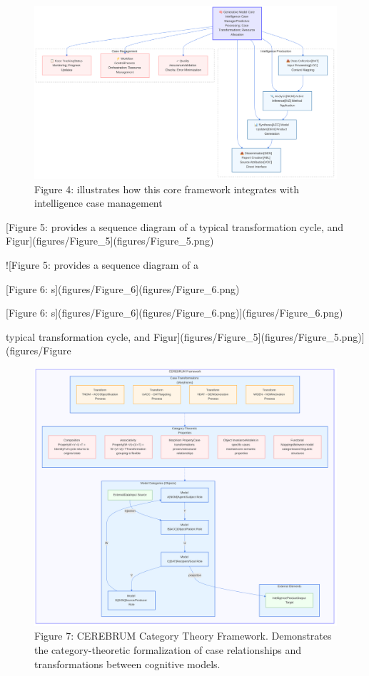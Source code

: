 \documentclass[
  11pt,
  letterpaper,
]{article}
\begin{document}
\begin{figure}
\centering
\includegraphics{figures/Figure_4.png}
\caption{Figure 4: illustrates how this core framework integrates with
intelligence case management}
\end{figure}

{[}Figure 5: provides a sequence diagram of a typical transformation
cycle, and Figur{]}(figures/Figure\_5{]}(figures/Figure\_5.png)

!{[}Figure 5: provides a sequence diagram of a

{[}Figure 6: s{]}(figures/Figure\_6{]}(figures/Figure\_6.png)

{[}Figure 6:
s{]}(figures/Figure\_6{]}(figures/Figure\_6.png){]}(figures/Figure\_6.png)

typical transformation cycle, and
Figur{]}(figures/Figure\_5{]}(figures/Figure\_5.png){]}(figures/Figure

\begin{figure}
\centering
\includegraphics{figures/Figure_7.png}
\caption{Figure 7: CEREBRUM Category Theory Framework. Demonstrates the
category-theoretic formalization of case relationships and
transformations between cognitive models.}
\end{figure}
\end{document}
